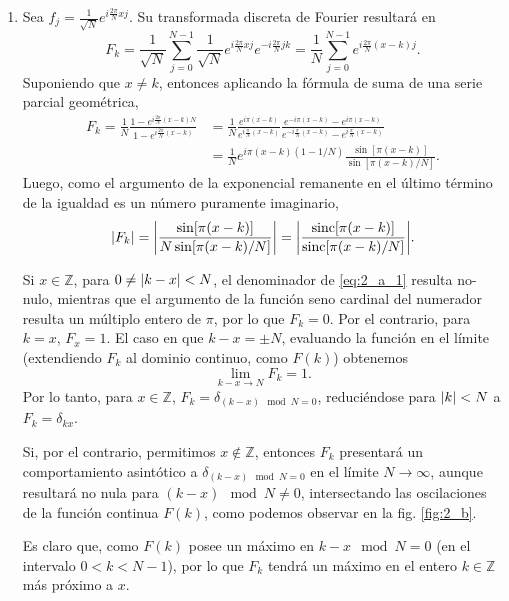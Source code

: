 \documentclass{scrartcl}
\newcommand{\inv}[1]{\frac{1}{#1}}
\newcommand{\sinc}{\text{sinc}}
\DeclareRobustCommand{\[}{\begin{equation}}
\DeclareRobustCommand{\]}{\end{equation}}
\begin{document}
\begin{enumerate}
    \item Sea $\displaystyle f_j = \inv{\sqrt{N}} e^{i \frac{2\pi}{N} xj}$. Su transformada discreta de Fourier resultará en
    \[ F_k = \inv{\sqrt{N}} \sum_{j = 0}^{N - 1} \inv{\sqrt{N}} e^{i \frac{2\pi}{N} xj} e^{-i \frac{2\pi}{N} jk} = \inv{N} \sum_{j = 0}^{N - 1} e^{i \frac{2\pi}{N} (x - k) j}. \]
    Suponiendo que $x \neq k$, entonces aplicando la fórmula de suma de una serie parcial geométrica,
    \begin{align}
        F_k = \inv{N} \frac{1 - e^{i \frac{2\pi}{N} (x - k) N}}{1 - e^{i \frac{2\pi}{N} (x - k)}} &= \inv{N} \frac{e^{i \pi (x - k)}}{e^{i \frac{\pi}{N} (x - k)}} \frac{e^{-i \pi (x - k)} - e^{i \pi (x - k)}}{e^{-i \frac{\pi}{N} (x - k)} - e^{i \frac{\pi}{N} (x - k)}} \\
            &= \inv{N} e^{i \pi (x - k) (1 - 1/N)} \frac{\sin[\pi (x - k)]}{\sin[\pi (x - k) / N]}.
    \end{align}
    Luego, como el argumento de la exponencial remanente en el último término de la igualdad es un número puramente imaginario,
    \[ \abs{F_k} = \abs{\frac{\sin[\pi (x - k)]}{N \sin[\pi (x - k) / N]}} = \abs{\frac{\sinc[\pi (x - k)]}{\sinc[\pi (x - k) / N]}}. \label{eq:2_a_1} \]
    
    Si $x \in \mathds{Z}$, para $0 \neq \abs{k - x} < N$, el denominador de \eqref{eq:2_a_1} resulta no-nulo, mientras que el argumento de la función seno cardinal del numerador resulta un múltiplo entero de $\pi$, por lo que $F_k = 0$. Por el contrario, para $k = x$, $F_x = 1$. El caso en que $k - x = \pm N$, evaluando la función en el límite (extendiendo $F_k$ al dominio continuo, como $F(k)$) obtenemos
    \[ \lim_{k - x \to N} F_k = 1. \]
    Por lo tanto, para $x \in \mathds{Z}$, $F_k = \delta_{(k - x) \mod N = 0}$, reduciéndose para $\abs{k} < N$ a $F_k = \delta_{k x}$.
    
    Si, por el contrario, permitimos $x \not\in \mathds{Z}$, entonces $F_k$ presentará un comportamiento asintótico a $\delta_{(k - x) \mod N = 0}$ en el límite $N \to \infty$, aunque resultará no nula para $(k - x) \mod N \neq 0$, intersectando las oscilaciones de la función continua $F(k)$, como podemos observar en la fig. \ref{fig:2_b}.
    
    Es claro que, como $F(k)$ posee un máximo en $k - x \mod N = 0$ (en el intervalo $0 < k < N - 1$), por lo que $F_k$ tendrá un máximo en el entero $k \in \mathds{Z}$ más próximo a $x$.
    

\end{enumerate}
\end{document}
